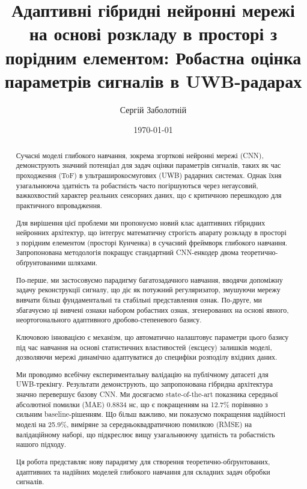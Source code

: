 \documentclass[12pt,a4paper]{article}
\title{Адаптивні гібридні нейронні мережі на основі розкладу в просторі з порідним елементом: Робастна оцінка параметрів сигналів в UWB-радарах}
\author{Сергій Заболотній}
\date{\today}
\begin{document}
	
	\maketitle
	
	\begin{abstract}
		Сучасні моделі глибокого навчання, зокрема згорткові нейронні мережі (CNN), демонструють значний потенціал для задач оцінки параметрів сигналів, таких як час проходження (ToF) в ультраширокосмугових (UWB) радарних системах. Однак їхня узагальнююча здатність та робастність часто погіршуються через негаусовий, важкохвостий характер реальних сенсорних даних, що є критичною перешкодою для практичного впровадження. 
		
		Для вирішення цієї проблеми ми пропонуємо новий клас адаптивних гібридних нейронних архітектур, що інтегрує математичну строгість апарату розкладу в просторі з порідним елементом (просторі Кунченка) в сучасний фреймворк глибокого навчання. Запропонована методологія покращує стандартний CNN-енкодер двома теоретично-обґрунтованими шляхами. 
		
		По-перше, ми застосовуємо парадигму багатозадачного навчання, вводячи допоміжну задачу реконструкції сигналу, що діє як потужний регуляризатор, змушуючи мережу вивчати більш фундаментальні та стабільні представлення ознак. По-друге, ми збагачуємо ці вивчені ознаки набором робастних ознак, згенерованих на основі явного, неортогонального адаптивного дробово-степеневого базису. 
		
		Ключовою інновацією є механізм, що автоматично налаштовує параметри цього базису під час навчання на основі статистичних властивостей (ексцесу) залишків моделі, дозволяючи мережі динамічно адаптуватися до специфіки розподілу вхідних даних.
		
		Ми проводимо всебічну експериментальну валідацію на публічному датасеті для UWB-трекінгу. Результати демонструють, що запропонована гібридна архітектура значно перевершує базову CNN. Ми досягаємо state-of-the-art показника середньої абсолютної помилки (MAE) 0.8834 нс, що є покращенням на 12.7\% порівняно з сильним baseline-рішенням. Що більш важливо, ми показуємо покращення надійності моделі на 25.9\%, виміряне за середньоквадратичною помилкою (RMSE) на валідаційному наборі, що підкреслює вищу узагальнюючу здатність та робастність нашого підходу.
		
		Ця робота представляє нову парадигму для створення теоретично-обґрунтованих, адаптивних та надійних моделей глибокого навчання для складних задач обробки сигналів.
	\end{abstract}
	
\end{document}
